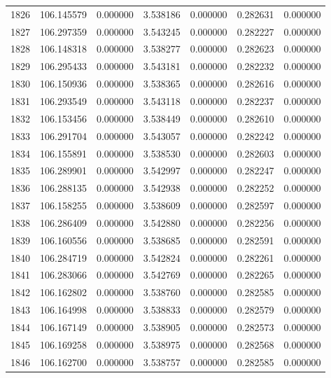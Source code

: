 \begin{tabular}{rrrrrrr}
1826 & 106.145579 &    0.000000 &  3.538186 &    0.000000 &    0.282631 &  0.000000 \\
1827 & 106.297359 &    0.000000 &  3.543245 &    0.000000 &    0.282227 &  0.000000 \\
1828 & 106.148318 &    0.000000 &  3.538277 &    0.000000 &    0.282623 &  0.000000 \\
1829 & 106.295433 &    0.000000 &  3.543181 &    0.000000 &    0.282232 &  0.000000 \\
1830 & 106.150936 &    0.000000 &  3.538365 &    0.000000 &    0.282616 &  0.000000 \\
1831 & 106.293549 &    0.000000 &  3.543118 &    0.000000 &    0.282237 &  0.000000 \\
1832 & 106.153456 &    0.000000 &  3.538449 &    0.000000 &    0.282610 &  0.000000 \\
1833 & 106.291704 &    0.000000 &  3.543057 &    0.000000 &    0.282242 &  0.000000 \\
1834 & 106.155891 &    0.000000 &  3.538530 &    0.000000 &    0.282603 &  0.000000 \\
1835 & 106.289901 &    0.000000 &  3.542997 &    0.000000 &    0.282247 &  0.000000 \\
1836 & 106.288135 &    0.000000 &  3.542938 &    0.000000 &    0.282252 &  0.000000 \\
1837 & 106.158255 &    0.000000 &  3.538609 &    0.000000 &    0.282597 &  0.000000 \\
1838 & 106.286409 &    0.000000 &  3.542880 &    0.000000 &    0.282256 &  0.000000 \\
1839 & 106.160556 &    0.000000 &  3.538685 &    0.000000 &    0.282591 &  0.000000 \\
1840 & 106.284719 &    0.000000 &  3.542824 &    0.000000 &    0.282261 &  0.000000 \\
1841 & 106.283066 &    0.000000 &  3.542769 &    0.000000 &    0.282265 &  0.000000 \\
1842 & 106.162802 &    0.000000 &  3.538760 &    0.000000 &    0.282585 &  0.000000 \\
1843 & 106.164998 &    0.000000 &  3.538833 &    0.000000 &    0.282579 &  0.000000 \\
1844 & 106.167149 &    0.000000 &  3.538905 &    0.000000 &    0.282573 &  0.000000 \\
1845 & 106.169258 &    0.000000 &  3.538975 &    0.000000 &    0.282568 &  0.000000 \\
1846 & 106.162700 &    0.000000 &  3.538757 &    0.000000 &    0.282585 &  0.000000 \\

\end{tabular}
